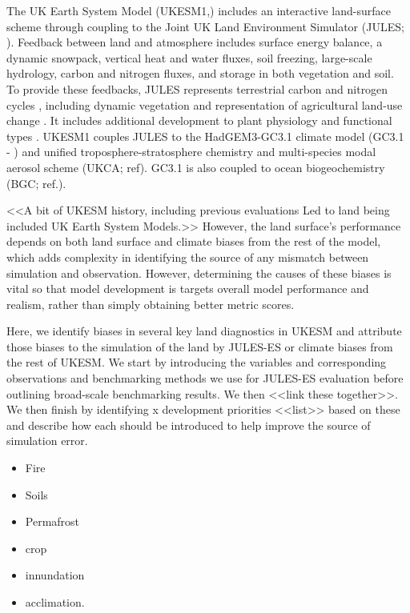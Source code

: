 \documentclass[bg, manuscript]{copernicus}
\begin{document}
The UK Earth System Model (UKESM1,\cite{Sellar2019-bo}) includes an interactive land-surface scheme through coupling to the Joint UK Land Environment Simulator (JULES; \cite{best2011joint,clark2011joint}). Feedback between land and atmosphere includes surface energy balance, a dynamic snowpack, vertical heat and water fluxes, soil freezing, large-scale hydrology, carbon and nitrogen fluxes, and storage in both vegetation and soil. To provide these feedbacks, JULES represents terrestrial carbon and nitrogen cycles \citep{wiltshire2020jules}, including dynamic vegetation and representation of agricultural land-use change \citep{robertson2019local}. It includes additional development to plant physiology and functional types \citep{harper2016improved, harper2018vegetation}. UKESM1 couples JULES to the HadGEM3-GC3.1 climate model (GC3.1 - \cite{kuhlbrodt2018low, williams2018met}) and unified troposphere-stratosphere chemistry and multi-species modal aerosol scheme (UKCA; ref). GC3.1 is also coupled to ocean biogeochemistry (BGC; ref.). 


<<A bit of UKESM history, including previous evaluations Led to land being included UK Earth System Models.>> However, the land surface's performance depends on both land surface and climate biases from the rest of the model, which adds complexity in identifying the source of any mismatch between simulation and observation. However, determining the causes of these biases is vital so that model development is targets overall model performance and realism, rather than simply obtaining better metric scores.

Here, we identify biases in several key land diagnostics in UKESM and attribute those biases to the simulation of the land by JULES-ES or climate biases from the rest of UKESM. We start by introducing the variables and corresponding observations and benchmarking methods we use for JULES-ES evaluation before outlining broad-scale benchmarking results. We then <<link these together>>. We then finish by identifying x development priorities <<list>> based on these and describe how each should be introduced to help improve the source of simulation error.

\begin{itemize}
    \item Fire
    \item Soils
    \item Permafrost
    \item crop
    \item innundation
    \item acclimation.
\end{itemize}
\end{document}
